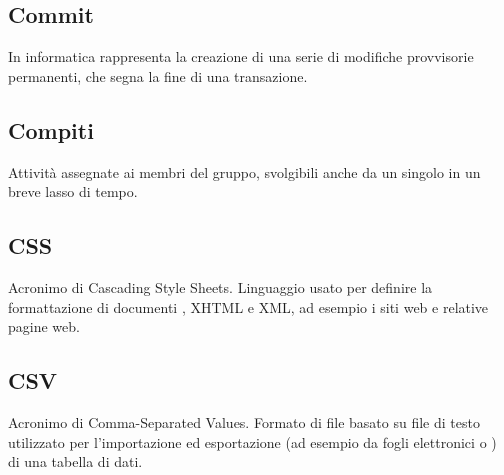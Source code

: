 \subsection*{Commit}
In informatica rappresenta la creazione di una serie di modifiche provvisorie permanenti, che segna la fine di una transazione.

\subsection*{Compiti}
Attività assegnate ai membri del gruppo, svolgibili anche da un singolo in un breve lasso di tempo.

\subsection*{CSS}
Acronimo di Cascading Style Sheets. Linguaggio usato per definire la formattazione di documenti , XHTML e XML, ad esempio i siti web e relative pagine web.

\subsection*{CSV}
Acronimo di Comma-Separated Values. Formato di file basato su file di testo utilizzato per l'importazione ed esportazione (ad esempio da fogli elettronici o ) di una tabella di dati. 




